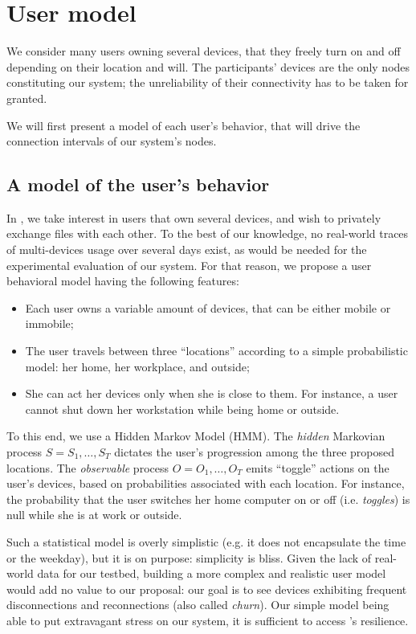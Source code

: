 \section{User model} 
\label{sec:user_model}

We consider many users owning several devices, that they freely turn on and off depending on their location and will.
The participants' devices are the only nodes constituting our system; the unreliability of their connectivity has to be taken for granted.

We will first present a model of each user's behavior, that will drive the connection intervals of our system's nodes.

\subsection{A model of the user's behavior}
\label{sub:a_model_of_the_user_s_behavior}

In \name, we take interest in users that own several devices, and wish to privately exchange files with each other.
To the best of our knowledge, no real-world traces of multi-devices usage over several days exist, as would be needed for the experimental evaluation of our system.
For that reason, we propose a user behavioral model having the following features:

\begin{itemize}
	\item Each user owns a variable amount of devices, that can be either mobile or immobile;
	\item The user travels between three ``locations'' according to a simple probabilistic model: her home, her workplace, and outside;
	\item She can act her devices only when she is close to them. For instance, a user cannot shut down her workstation while being home or outside.
\end{itemize}

To this end, we use a Hidden Markov Model (HMM). 
The \emph{hidden} Markovian process $S=S_1,\dots,S_T$ dictates the user's progression among the three proposed locations.
The \emph{observable} process $O=O_1,\dots,O_T$ emits ``toggle'' actions on the user's devices, based on probabilities associated with each location.
For instance, the probability that the user switches her home computer on or off (i.e. \emph{toggles}) is null while she is at work or outside.

Such a statistical model is overly simplistic (e.g. it does not encapsulate the time or the weekday), but it is on purpose: simplicity is bliss.
Given the lack of real-world data for our testbed, building a more complex and realistic user model would add no value to our proposal: 
our goal is to see devices exhibiting frequent disconnections and reconnections (also called \emph{churn}).
Our simple model being able to put extravagant stress on our system, it is sufficient to access \name's resilience.

